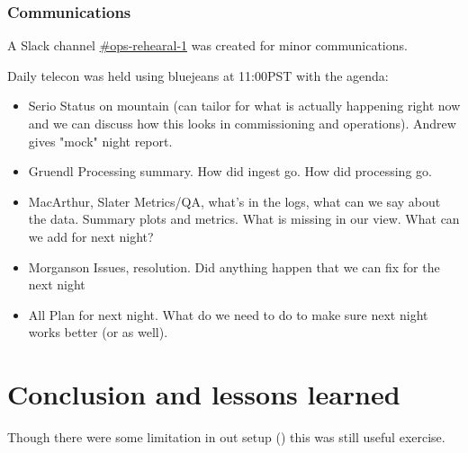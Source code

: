 \subsubsection{Communications }


A Slack channel \href{https://lsstc.slack.com/messages/CJBSY6FUN}{\#ops-rehearal-1}  was created
for minor communications.

Daily telecon was held using bluejeans at 11:00PST with the agenda:
\begin{itemize}
\item Serio	Status on mountain (can tailor for what is actually happening right now and we can discuss how this looks in commissioning and operations). Andrew gives "mock" night report.
\item Gruendl 	Processing summary. How did ingest go. How did processing go.
\item MacArthur, Slater	Metrics/QA, what's in the logs, what can we say about the data. Summary plots and metrics. What is missing in our view. What can we add for next night?
\item Morganson	Issues, resolution. Did anything happen that we can fix for the next night

\item All	Plan for next night. What do we need to do to make sure next night works better (or as well).
\end{itemize}







\section{Conclusion and lessons learned}\label{sec:conc}
Though there were some limitation in out setup () this was still useful exercise.



